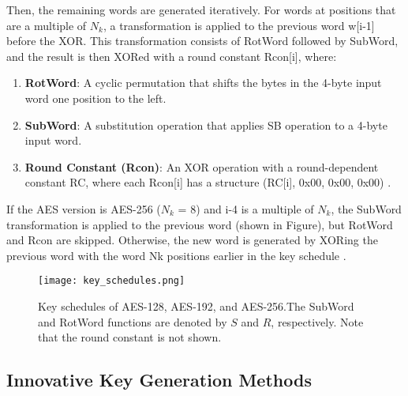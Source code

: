 Then, the remaining words are generated iteratively. For words at positions that are a multiple of $N_k$, a 
transformation is applied to the previous word w[i-1] before the XOR. This transformation consists of RotWord 
followed by SubWord, and the result is then XORed with a round constant Rcon[i], where:

\begin{enumerate}
    \item \textbf{RotWord}: A cyclic permutation that shifts the bytes in the 4-byte input word one position to the left. 
    \item \textbf{SubWord}: A substitution operation that applies SB operation to a 4-byte input word. 
    \item \textbf{Round Constant (Rcon)}:  An XOR operation with a round-dependent constant RC, where each Rcon[i]
    has a structure (RC[i], 0x00, 0x00, 0x00) \cite{Standards2001}. 
\end{enumerate}

If the AES version is AES-256 ($N_k$ = 8) and i-4 is a multiple of $N_k$, the SubWord transformation is applied to the 
previous word (shown in Figure), but RotWord and Rcon are skipped. Otherwise, the new word is generated by XORing the previous word 
with the word Nk positions earlier in the key schedule \cite{Standards2001}. 

\begin{figure}[h] %
    \centering
    \texttt{[image: key\_schedules.png]} %
    \caption{
        Key schedules of AES-128, AES-192, and AES-256.The SubWord and
        RotWord functions are denoted by $S$ and $R$, respectively. Note that the round
        constant is not shown. \cite{Key_Collisions}
    }
    \label{fig:key_comb} %
\end{figure}

\subsection{Innovative Key Generation Methods}